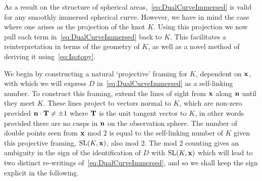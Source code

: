     As a result on the structure of spherical areas,~\eqref{eq:DualCurveImmersed} is valid for any smoothly immersed spherical curve. However, we have in mind the case where one arises as the projection of the knot $K$. Using this projection we now pull each term in~\eqref{eq:DualCurveImmersed} back to $K$. This facilitates a reinterpretation in terms of the geometry of $K$, as well as a novel method of deriving it using~\eqref{eq:Isotopy}.

    We begin by constructing a natural `projective' framing for $K$, dependent on $\bf x$, with which we will express $D$ in~\eqref{eq:DualCurveImmersed} as a self-linking number. To construct this framing, extend the lines of sight from ${\bf x}$ along ${\bf n}$ until they meet $K$. These lines project to vectors normal to $K$, which are non-zero provided ${\bf n} \cdot {\bf T} \neq \pm 1$ where ${\bf T}$ is the unit tangent vector to $K$, in other words provided there are no cusps in ${\bf n}$ on the observation sphere. The number of double points seen from $\bf x$ mod $2$ is equal to the self-linking number of $K$ given this projective framing, $\mathrm{SL}(K,{\bf x})$, also mod $2$. The mod $2$ counting gives an ambiguity in the sign of the identification of $D$ with $\mathrm{SL}(K,{\bf x})$ which will lead to two distinct re-writings of~\eqref{eq:DualCurveImmersed}, and so we shall keep the sign explicit in the following. 

